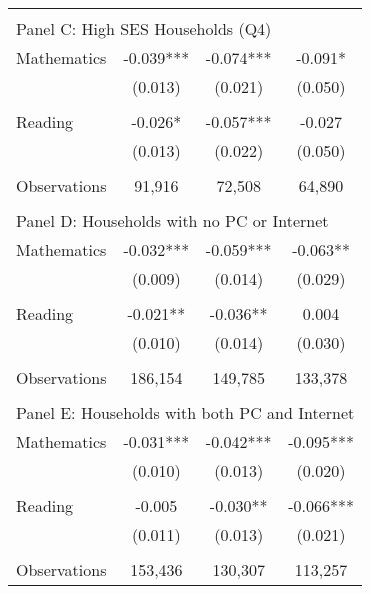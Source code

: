 {\begin{tabular}{lccc}
&  &  &   \\
\multicolumn{4}{l}{Panel C: High SES Households (Q4)} \\
\hspace{3mm}Mathematics&      -0.039***&      -0.074***&      -0.091*  \\
                    &     (0.013)   &     (0.021)   &     (0.050)   \\
 
&  &  &   \\
\hspace{3mm}Reading &      -0.026*  &      -0.057***&      -0.027   \\
                    &     (0.013)   &     (0.022)   &     (0.050)   \\
                    &               &               &               \\
\hspace{3mm}Observations&      91,916   &      72,508   &      64,890   \\
 
&  &  &   \\
\multicolumn{4}{l}{Panel D: Households with no PC or Internet} \\
\hspace{3mm}Mathematics&      -0.032***&      -0.059***&      -0.063** \\
                    &     (0.009)   &     (0.014)   &     (0.029)   \\
 
&  &  &   \\
\hspace{3mm}Reading &      -0.021** &      -0.036** &       0.004   \\
                    &     (0.010)   &     (0.014)   &     (0.030)   \\
                    &               &               &               \\
\hspace{3mm}Observations&     186,154   &     149,785   &     133,378   \\
 
&  &  &   \\
\multicolumn{4}{l}{Panel E: Households with both PC and Internet} \\
\hspace{3mm}Mathematics&      -0.031***&      -0.042***&      -0.095***\\
                    &     (0.010)   &     (0.013)   &     (0.020)   \\
 
&  &  &   \\
\hspace{3mm}Reading &      -0.005   &      -0.030** &      -0.066***\\
                    &     (0.011)   &     (0.013)   &     (0.021)   \\
                    &               &               &               \\
\hspace{3mm}Observations&     153,436   &     130,307   &     113,257   \\
 

\bottomrule
\end{tabular}
}
